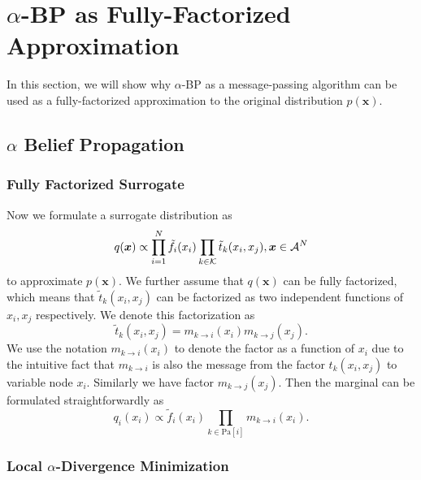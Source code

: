 \documentclass[conference]{IEEEtran}
\begin{document}


\section{$\alpha$-BP as Fully-Factorized Approximation}
In this section, we will show why $\alpha$-BP as a message-passing algorithm can be used as a fully-factorized approximation to the original distribution $p(\bm{x})$. 




\subsection{$\alpha$ Belief Propagation}
\subsubsection{Fully Factorized Surrogate}
Now we formulate a surrogate distribution as
\begin{equation}
  q(\bm{x}) \propto \prod_{{i=1}}^{N} \tilde{f}_i(x_i) \prod_{k\in \mathcal{K}} \tilde{t}_k(x_i, x_j), \bm{x} \in \mathcal{A}^N
\end{equation}
to approximate $p(\bm{x})$. We further assume that $q(\bm{x})$ can be fully factorized, which means that $\tilde{t}_k(x_i, x_j)$ can be factorized as two independent functions of $x_i, x_j$ respectively. We denote this factorization as
\begin{equation}
  \tilde{t}_k(x_i, x_j) = m_{k\rightarrow i}(x_i) m_{k\rightarrow j}(x_j).
\end{equation}
We use the notation $m_{k\rightarrow i}(x_i)$ to denote the factor as a function of $x_i$ due to the intuitive fact that $m_{k\rightarrow i}$ is also the message from the factor $t_k(x_i, x_j)$ to variable node $x_i$. Similarly we have factor $m_{k\rightarrow j}(x_j)$. Then the marginal can be formulated straightforwardly as
\begin{equation}
  q_i(x_i) \propto \tilde{f}_i(x_i) \prod_{k\in \text{Pa}[i]} m_{k\rightarrow i}(x_i).
\end{equation}

\subsubsection{Local $\alpha$-Divergence Minimization}
\end{document}
